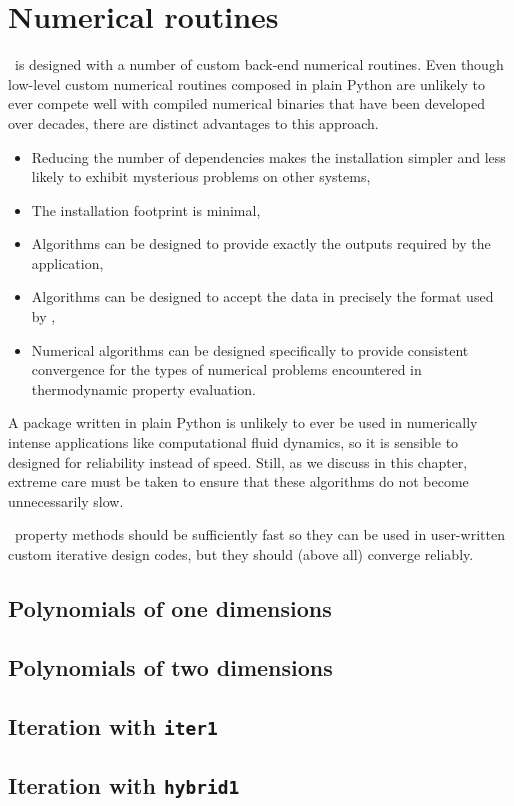 \chapter{Numerical routines}\label{ch:num}

\PM\ is designed with a number of custom back-end numerical routines.  Even though low-level custom numerical routines composed in plain Python are unlikely to ever compete well with compiled numerical binaries that have been developed over decades, there are distinct advantages to this approach.
\begin{itemize}
\item Reducing the number of dependencies makes the installation simpler and less likely to exhibit mysterious problems on other systems,
\item The installation footprint is minimal,
\item Algorithms can be designed to provide exactly the outputs required by the application,
\item Algorithms can be designed to accept the data in precisely the format used by \PM,
\item Numerical algorithms can be designed specifically to provide consistent convergence for the types of numerical problems encountered in thermodynamic property evaluation.
\end{itemize}

A package written in plain Python is unlikely to ever be used in numerically intense applications like computational fluid dynamics, so it is sensible to designed for reliability instead of speed.  Still, as we discuss in this chapter, extreme care must be taken to ensure that these algorithms do not become unnecessarily slow.  

\PM\ property methods should be sufficiently fast so they can be used in user-written custom iterative design codes, but they should (above all) converge reliably.


\section{Polynomials of one dimensions}\label{sec:num:poly1}

\section{Polynomials of two dimensions}\label{sec:num:poly2}

\section{Iteration with \texttt{iter1}}\label{sec:num:iter1}

\section{Iteration with \texttt{hybrid1}}\label{sec:num:hybrid1}

